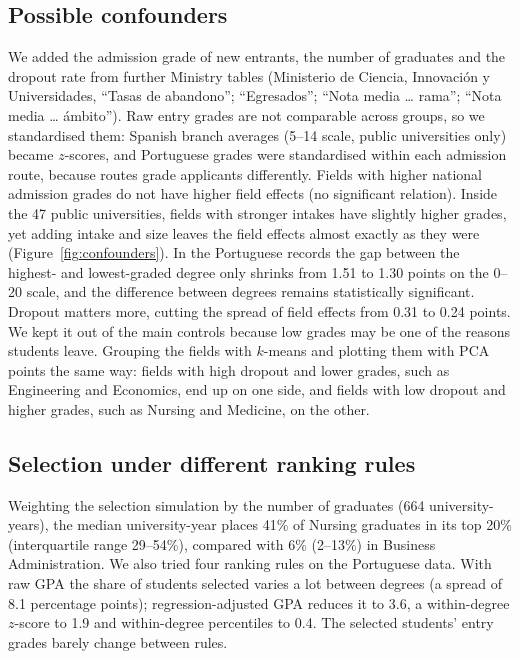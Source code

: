 \documentclass[clean]{bam-progress}
\begin{document}
\subsection{Possible confounders}

We added the admission grade of new entrants, the number of graduates and the dropout rate from further Ministry tables (Ministerio de Ciencia, Innovaci\'on y Universidades, ``Tasas de abandono''; ``Egresados''; ``Nota media \ldots{} rama''; ``Nota media \ldots{} \'ambito''). Raw entry grades are not comparable across groups, so we standardised them: Spanish branch averages (5--14 scale, public universities only) became $z$-scores, and Portuguese grades were standardised within each admission route, because routes grade applicants differently. Fields with higher national admission grades do not have higher field effects (no significant relation). Inside the 47 public universities, fields with stronger intakes have slightly higher grades, yet adding intake and size leaves the field effects almost exactly as they were (Figure~\ref{fig:confounders}). In the Portuguese records the gap between the highest- and lowest-graded degree only shrinks from 1.51 to 1.30 points on the 0--20 scale, and the difference between degrees remains statistically significant. Dropout matters more, cutting the spread of field effects from 0.31 to 0.24 points. We kept it out of the main controls because low grades may be one of the reasons students leave. Grouping the fields with $k$-means and plotting them with PCA points the same way: fields with high dropout and lower grades, such as Engineering and Economics, end up on one side, and fields with low dropout and higher grades, such as Nursing and Medicine, on the other.

\subsection{Selection under different ranking rules}

Weighting the selection simulation by the number of graduates (664 university-years), the median university-year places 41\% of Nursing graduates in its top 20\% (interquartile range 29--54\%), compared with 6\% (2--13\%) in Business Administration. We also tried four ranking rules on the Portuguese data. With raw GPA the share of students selected varies a lot between degrees (a spread of 8.1 percentage points); regression-adjusted GPA reduces it to 3.6, a within-degree $z$-score to 1.9 and within-degree percentiles to 0.4. The selected students' entry grades barely change between rules.
\end{document}
